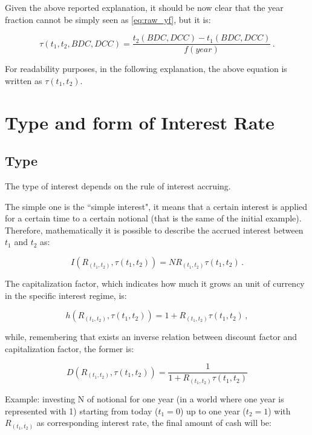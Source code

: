 Given the above reported explanation, it should be now clear that the year fraction cannot be simply seen as \eqref{eq:raw_yf}, but it is:

\begin{equation}
    \tau(t_{1},t_{2},BDC,DCC)=\dfrac{t_{2}(BDC,DCC)-t_{1}(BDC,DCC)}{f(year)}\,.
\end{equation}

For readability purposes, in the following explanation, the above equation is written as $\tau(t_{1},t_{2})$.

\section{Type and form of Interest Rate}

\subsection{Type} 

The type of interest depends on the rule of interest accruing.

The simple one is the ``simple interest", it means that a certain interest is applied for a certain time to a certain notional (that is the same of the initial example). Therefore, mathematically it is possible to describe the accrued interest between $t_{1}$ and $t_{2}$ as:

\begin{equation}
   I(R_{(t_{1},t_{2})},\tau(t_{1},t_{2}))= N R_{(t_{1},t_{2})} \tau(t_{1},t_{2})\,.
   \label{eq:simple_interest}
\end{equation}

The capitalization factor, which indicates how much it grows an unit of currency in the specific interest regime, is:

\begin{equation}
    h(R_{(t_{1},t_{2})},\tau(t_{1},t_{2})) =1+ R_{(t_{1},t_{2})} \tau(t_{1},t_{2})\,,
    \label{eq:simple_interest_cf}
\end{equation}

while, remembering that exists an inverse relation between discount factor and capitalization factor, the former is:

\begin{equation}
    D(R_{(t_{1},t_{2})},\tau(t_{1},t_{2})) =\dfrac{1}{1+ R_{(t_{1},t_{2})} \tau(t_{1},t_{2})}
    \label{eq:simple_interest_df}
\end{equation}

Example: investing N of notional for one year (in a world where one year is represented with 1) starting from today ($t_{1}=0$) up to one year ($t_{2}=1$) with $R_{(t_{1},t_{2})}$ as corresponding interest rate, the final amount of cash will be:

